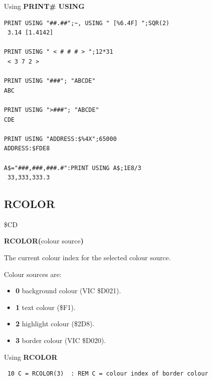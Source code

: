 \begin{description}[leftmargin=2cm,style=nextline]
\newpage
\item [Examples:] Using {\bf PRINT\# USING}

\begin{tcolorbox}[colback=black,coltext=white]
\verbatimfont{\codefont}
\begin{verbatim}
PRINT USING "##.##";~, USING " [%6.4F] ";SQR(2)
 3.14 [1.4142]

PRINT USING " < # # # > ";12*31
 < 3 7 2 >

PRINT USING "###"; "ABCDE"
ABC

PRINT USING ">###"; "ABCDE"
CDE

PRINT USING "ADDRESS:$%4X";65000
ADDRESS:$FDE8

A$="###,###,###.#":PRINT USING A$;1E8/3
 33,333,333.3
\end{verbatim}
\end{tcolorbox}
\end{description}


\newpage
\subsection{RCOLOR}
\begin{description}[leftmargin=2cm,style=nextline]
\item [Token:] \$CD
\item [Format:] {\bf RCOLOR(}colour source{\bf)}
\item [Returns:]  The current colour index for the
                selected colour source.

                Colour sources are:
                \begin{itemize}
                    \item {\bf 0} background colour (VIC \$D021).
                    \item {\bf 1} text colour (\$F1).
                    \item {\bf 2} highlight colour (\$2D8).
                    \item {\bf 3} border colour (VIC \$D020).
                \end{itemize}

\item [Example:] Using {\bf RCOLOR}

\begin{tcolorbox}[colback=black,coltext=white]
\verbatimfont{\codefont}
\begin{verbatim}
 10 C = RCOLOR(3)  : REM C = colour index of border colour
\end{verbatim}
\end{tcolorbox}
\end{description}

